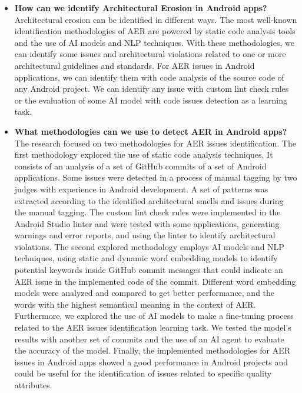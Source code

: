 \begin{itemize}
	\item  \textbf{How can we identify Architectural Erosion in Android apps?} Architectural erosion can be identified in different ways. The most well-known identification methodologies of AER are powered by static code analysis tools and the use of AI models and NLP techniques. With these methodologies, we can identify some issues and architectural violations related to one or more architectural guidelines and standards. For AER issues in Android applications, we can identify them with code analysis of the source code of any Android project. We can identify any issue with custom lint check rules or the evaluation of some AI model with code issues detection as a learning task.
	
	\item  \textbf{What methodologies can we use to detect AER in Android apps?} The research focused on two methodologies for AER issues identification. The first methodology explored the use of static code analysis techniques. It consists of an analysis of a set of GitHub commits of a set of Android applications. Some issues were detected in a process of manual tagging by two judges with experience in Android development. A set of patterns was extracted according to the identified architectural smells and issues during the manual tagging. The custom lint check rules were implemented in the Android Studio linter and were tested with some applications, generating warnings and error reports, and using the linter to identify architectural violations. The second explored methodology employs AI models and NLP techniques, using static and dynamic word embedding models to identify potential keywords inside GitHub commit messages that could indicate an AER issue in the implemented code of the commit. Different word embedding models were analyzed and compared to get better performance, and the words with the highest semantical meaning in the context of AER. Furthermore, we explored the use of AI models to make a fine-tuning process related to the AER issues identification learning task. We tested the model's results with another set of commits and the use of an AI agent to evaluate the accuracy of the model. Finally, the implemented methodologies for AER issues in Android apps showed a good performance in Android projects and could be useful for the identification of issues related to specific quality attributes.
	

\end{itemize}
